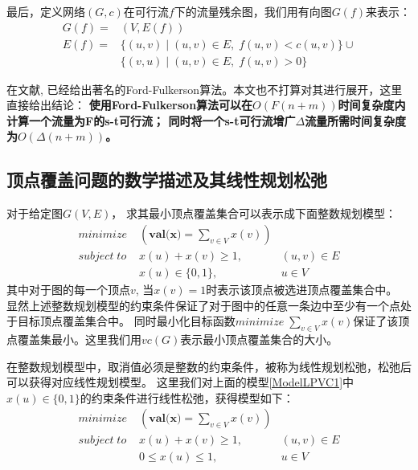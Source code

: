 最后，定义网络$(G, c)$在可行流$f$下的流量残余图，我们用有向图$G(f)$来表示：
\begin{equation*} \begin{aligned}
  G(f) = &(V, E(f)) \\
  E(f) = &\{(u,v)\;|\;(u, v) \in E,\;f(u, v) < c(u, v)\} \cup \\
  &\{(v,u)\;|\;(u, v) \in E,\;f(u, v) > 0\}
\end{aligned} \end{equation*}

在文献\cite{ford1962flows}, 已经给出著名的Ford-Fulkerson算法。本文也不打算对其进行展开，这里直接给出结论：
\textbf{使用Ford-Fulkerson算法可以在$O(F(n + m))$时间复杂度内计算一个流量为F的s-t可行流；
同时将一个s-t可行流增广$\Delta$流量所需时间复杂度为$O(\Delta(n + m))$。}

\subsection{顶点覆盖问题的数学描述及其线性规划松弛}
对于给定图$G(V, E)$， 求其最小顶点覆盖集合可以表示成下面整数规划模型：
\begin{equation} \label{ModelLPVC1} \begin{aligned}
  minimize\; & (\textbf{val(x)} = \sum_{v \in V}{x(v)}) &\\
  subject\; to\; & x(u) + x(v) \ge 1, &(u, v) \in E \\
   & x(u) \in \{0, 1\}, & u \in V
\end{aligned} \end{equation}
其中对于图的每一个顶点$v$, 当$x(v) = 1$时表示该顶点被选进顶点覆盖集合中。
显然上述整数规划模型的约束条件保证了对于图中的任意一条边中至少有一个点处于目标顶点覆盖集合中。
同时最小化目标函数$minimize\; \sum_{v \in V}{x(v)}$保证了该顶点覆盖集最小。这里我们用$vc(G)$表示最小顶点覆盖集合的大小。

在整数规划模型中，取消值必须是整数的约束条件，被称为线性规划松弛，松弛后可以获得对应线性规划模型。
这里我们对上面的模型\ref{ModelLPVC1}中$x(u) \in \{0, 1\}$的约束条件进行线性松弛，获得模型如下：
\begin{equation} \begin{aligned}
  minimize\; & (\textbf{val(x)} = \sum_{v \in V}{x(v)}) &\\
  subject\; to\; & x(u) + x(v) \ge 1, &(u, v) \in E \\
   & 0 \le x(u) \le 1, & u \in V
\end{aligned} \end{equation}

